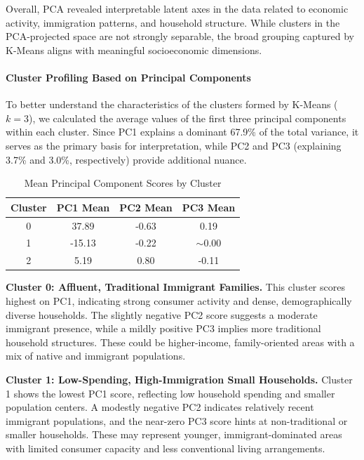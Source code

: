 \documentclass{article}
\begin{document}
Overall, PCA revealed interpretable latent axes in the data related to economic activity, immigration patterns, and household structure. While clusters in the PCA-projected space are not strongly separable, the broad grouping captured by K-Means aligns with meaningful socioeconomic dimensions.

\paragraph{Cluster Profiling Based on Principal Components}

To better understand the characteristics of the clusters formed by K-Means ($k=3$), we calculated the average values of the first three principal components within each cluster. Since PC1 explains a dominant 67.9\% of the total variance, it serves as the primary basis for interpretation, while PC2 and PC3 (explaining 3.7\% and 3.0\%, respectively) provide additional nuance.

\begin{table}[H]
    \centering
    \caption{Mean Principal Component Scores by Cluster}
    \label{tab:cluster-pc-means}
    \begin{tabular}{@{}cccc@{}}
        \toprule
        Cluster & PC1 Mean & PC2 Mean & PC3 Mean \\
        \midrule
        0 & 37.89 & -0.63 & 0.19 \\
        1 & -15.13 & -0.22 & $\sim$0.00 \\
        2 & 5.19 & 0.80 & -0.11 \\
        \bottomrule
    \end{tabular}
\end{table}

\textbf{Cluster 0: Affluent, Traditional Immigrant Families.}  
This cluster scores highest on PC1, indicating strong consumer activity and dense, demographically diverse households. The slightly negative PC2 score suggests a moderate immigrant presence, while a mildly positive PC3 implies more traditional household structures. These could be higher-income, family-oriented areas with a mix of native and immigrant populations.

\textbf{Cluster 1: Low-Spending, High-Immigration Small Households.}  
Cluster 1 shows the lowest PC1 score, reflecting low household spending and smaller population centers. A modestly negative PC2 indicates relatively recent immigrant populations, and the near-zero PC3 score hints at non-traditional or smaller households. These may represent younger, immigrant-dominated areas with limited consumer capacity and less conventional living arrangements.
\end{document}
